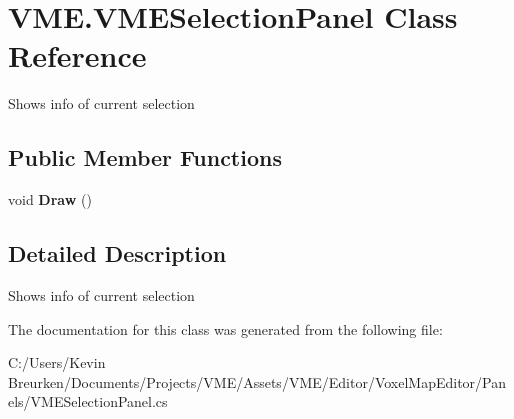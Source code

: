 \hypertarget{class_v_m_e_1_1_v_m_e_selection_panel}{}\section{V\+M\+E.\+V\+M\+E\+Selection\+Panel Class Reference}
\label{class_v_m_e_1_1_v_m_e_selection_panel}


Shows info of current selection  


\subsection*{Public Member Functions}
\begin{DoxyCompactItemize}
\item 
void {\bfseries Draw} ()\hypertarget{class_v_m_e_1_1_v_m_e_selection_panel_ace194e8e28d5d546c24896bdc61386dc}{}\label{class_v_m_e_1_1_v_m_e_selection_panel_ace194e8e28d5d546c24896bdc61386dc}

\end{DoxyCompactItemize}


\subsection{Detailed Description}
Shows info of current selection 



The documentation for this class was generated from the following file\+:\begin{DoxyCompactItemize}
\item 
C\+:/\+Users/\+Kevin Breurken/\+Documents/\+Projects/\+V\+M\+E/\+Assets/\+V\+M\+E/\+Editor/\+Voxel\+Map\+Editor/\+Panels/V\+M\+E\+Selection\+Panel.\+cs\end{DoxyCompactItemize}
